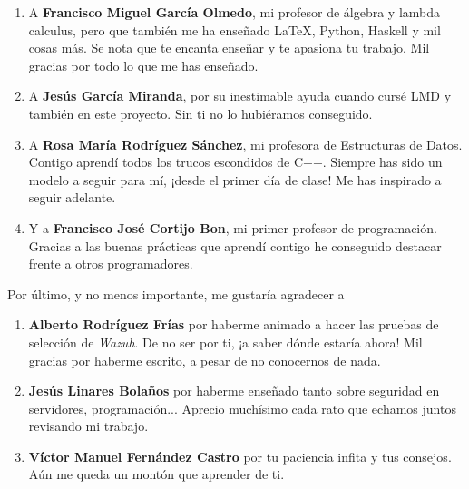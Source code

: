 \begin{enumerate}[---]
	\item A \textbf{Francisco Miguel García Olmedo}, mi profesor de álgebra y lambda calculus, pero que también me ha enseñado \LaTeX, Python, Haskell y mil cosas más. Se nota que te encanta enseñar y te apasiona tu trabajo. Mil gracias por todo lo que me has enseñado.
	\item A \textbf{Jesús García Miranda}, por su inestimable ayuda cuando cursé LMD y también en este proyecto. Sin ti no lo hubiéramos conseguido.
	\item A \textbf{Rosa María Rodríguez Sánchez}, mi profesora de Estructuras de Datos. Contigo aprendí todos los trucos escondidos de C++. Siempre has sido un modelo a seguir para mí, ¡desde el primer día de clase! Me has inspirado a seguir adelante.
	\item Y a \textbf{Francisco José Cortijo Bon}, mi primer profesor de programación. Gracias a las buenas prácticas que aprendí contigo he conseguido destacar frente a otros programadores.
\end{enumerate}

Por último, y no menos importante, me gustaría agradecer a 

\begin{enumerate}[---]
	\item \textbf{Alberto Rodríguez Frías} por haberme animado a hacer las pruebas de selección de \textit{Wazuh}. De no ser por ti, ¡a saber dónde estaría ahora! Mil gracias por haberme escrito, a pesar de no conocernos de nada.
	\item \textbf{Jesús Linares Bolaños} por haberme enseñado tanto sobre seguridad en servidores, programación... Aprecio muchísimo cada rato que echamos juntos revisando mi trabajo.
	\item \textbf{Víctor Manuel Fernández Castro} por tu paciencia infita y tus consejos. Aún me queda un montón que aprender de ti.
\end{enumerate}
